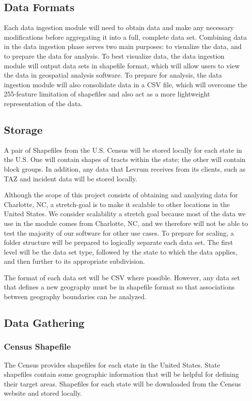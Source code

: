 \documentclass[onecolumn, draftclsnofoot,10pt, compsoc]{IEEEtran}
\begin{document}
\begin{singlespace}
    \subsection{Data Formats}
    Each data ingestion module will need to obtain data and make any necessary modifications before aggregating it into a full, complete data set.
    Combining data in the data ingestion phase serves two main purposes: to visualize the data, and to prepare the data for analysis.
    To best visualize data, the data ingestion module will output data sets in shapefile format, which will allow
    users to view the data in geospatial analysis software.
    To prepare for analysis, the data ingestion module will also consolidate data in a CSV file, which will overcome the 255-feature limitation of shapefiles and also act as a more lightweight representation of the data.
        
    \subsection{Storage}
    A pair of Shapefiles from the U.S. Census will be stored locally for each state in the U.S.
    One will contain shapes of tracts within the state; the other will contain block groups.
    In addition, any data that Levrum receives from its clients, such as TAZ and incident data will be stored locally.
    
    Although the scope of this project consists of obtaining and analyzing data for Charlotte, NC, a stretch-goal is to make it scalable to other locations in the United States. 
    We consider scalability a stretch goal because most of the data we use in the module comes from Charlotte, NC, and we therefore will not be able to test the majority of our software for other use cases.
    To prepare for scaling, a folder structure will be prepared to logically separate each data set.
    The first level will be the data set type, followed by the state to which the data applies, and then further to its appropriate subdivision.

    The format of each data set will be CSV where possible. However, any data set that defines a new geography must be in shapefile format so that associations between geography boundaries can be analyzed. 
    
    \subsection{Data Gathering}
        \subsubsection{Census Shapefile}
        The Census provides shapefiles for each state in the United States. State shapefiles contain some geographic information that will be helpful for defining their target areas.
        Shapefiles for each state will be downloaded from the Census website and stored locally.
        

\end{singlespace}
\end{document}
